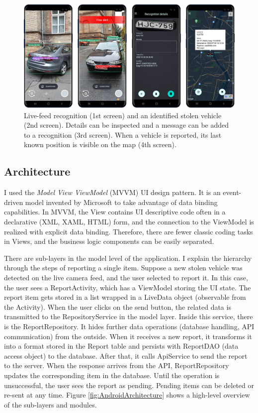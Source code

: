 \begin{figure}[H]
 \centerline{\includegraphics[width=1.0\columnwidth]{.//Figure/System/AppImages.png}}
 \caption{Live-feed recognition (1st screen) and an identified stolen vehicle (2nd screen). Details can be inspected and a message can be added to a recognition (3rd screen). When a vehicle is reported, its last known position is visible on the map (4th screen).}
 \label{fig:AppImages}
\end{figure}

\subsection{Architecture}

I used the \textit{Model View ViewModel} (MVVM) UI design pattern. It is an event-driven model invented by Microsoft to take advantage of data binding capabilities. In MVVM, the View contains UI descriptive code often in a declarative (XML, XAML, HTML) form, and the connection to the ViewModel is realized with explicit data binding. Therefore, there are fewer classic coding tasks in Views, and the business logic components can be easily separated.

There are sub-layers in the model level of the application. I explain the hierarchy through the steps of reporting a single item. Suppose a new stolen vehicle was detected on the live camera feed, and the user selected to report it. In this case, the user sees a ReportActivity, which has a ViewModel storing the UI state. The report item gets stored in a list wrapped in a LiveData object (observable from the Activity). When the user clicks on the send button, the related data is transmitted to the RepositoryService in the model layer. Inside this service, there is the ReportRepository. It hides further data operations (database handling, API communication) from the outside. When it receives a new report, it transforms it into a format stored in the Report table and persists with ReportDAO (data access object) to the database. After that, it calls ApiService to send the report to the server. When the response arrives from the API, ReportRepository updates the corresponding item in the database. Until the operation is unsuccessful, the user sees the report as pending. Pending items can be deleted or re-sent at any time. Figure \ref{fig:AndroidArchitecture} shows a high-level overview of the sub-layers and modules.

